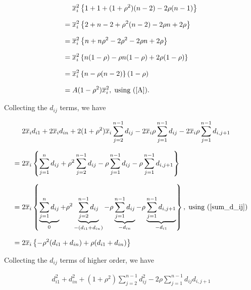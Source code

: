 \documentclass[11pt, a4paper]{article}
\begin{document}
\begin{itemize}
\begin{align}\label{x_i_square_final}
&\overline{x}_i^2 \left\{ 1 + 1 + (1+\rho^2)(n-2) - 2\rho (n-1) \right\} \nonumber \\[0.7em]
=\; &\overline{x}_i^2 \left\{ 2 + n - 2 + \rho^2(n-2) - 2\rho n + 2\rho \right\} \nonumber \\[0.7em]
=\; &\overline{x}_i^2 \left\{ n + n\rho^2 -2\rho^2 - 2\rho n + 2\rho \right\} \nonumber \\[0.7em]
=\; &\overline{x}_i^2 \left\{ n(1 - \rho) - \rho n (1 - \rho) + 2\rho (1 - \rho) \right\} \nonumber \\[0.7em]
=\; &\overline{x}_i^2 \left\{ n - \rho(n - 2) \right\} (1 - \rho) \nonumber \\[0.7em]
=\; &A (1 - \rho^2)\overline{x}_i^2, \; \text{using (\ref{A})}.
\end{align}

Collecting the $d_{ij}$ terms, we have

\begin{align}\label{d_ij_terms_collected}
&2 \overline{x}_i d_{i1} + 2 \overline{x}_i d_{in} + 2 (1 + \rho^2) \overline{x}_i \sum \limits_{j = 2}^{n-1} d_{ij} - 2 \overline{x}_i \rho \sum \limits_{j = 1}^{n-1} d_{ij} - 2 \overline{x}_i \rho \sum \limits_{j = 1}^{n-1} d_{i,j+1} \nonumber \\[0.7em]
=\; &2 \overline{x}_i \left\{ \sum \limits_{j = 1}^{n} d_{ij} + \rho^2 \sum \limits_{j = 2}^{n-1} d_{ij} - \rho \sum \limits_{j = 1}^{n-1} d_{ij} - \rho \sum \limits_{j = 1}^{n-1} d_{i,j+1}\right\} \nonumber \\[0.7em]
=\; &2 \overline{x}_i \left\{ \underbrace{\sum \limits_{j = 1}^{n} d_{ij}}_{0} + \rho^2 \underbrace{\sum \limits_{j = 2}^{n-1} d_{ij}}_{-(d_{i1} + d_{in})} - \rho \underbrace{\sum \limits_{j = 1}^{n-1} d_{ij}}_{-d_{in}} - \rho \underbrace{\sum \limits_{j = 1}^{n-1} d_{i,j+1}}_{-d_{i1}}\right\}, \; \text{using (\ref{sum_d_ij})} \nonumber \\[0.7em]
=\; &2 \overline{x}_i \left\{- \rho^2 (d_{i1} + d_{in}) + \rho (d_{i1} + d_{in})\right\}
\end{align}

Collecting the $d_{ij}$ terms of higher order, we have

\begin{align}\label{d_ij_higher_order_initial}
d_{i1}^2 + d_{in}^2 + (1+\rho^2)\sum\limits_{j=2}^{n-1} d_{ij}^2 - 2\rho \sum\limits_{j=1}^{n-1} d_{ij} d_{i,j+1}
\end{align}


\end{itemize}
\end{document}
